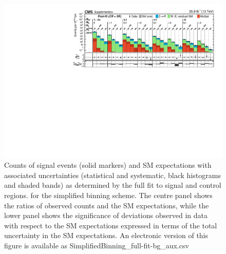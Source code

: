 \begin{figure}[h!]
  \centering
  \includegraphics[width=0.95\linewidth]{Supplementary/SimplifiedBinning_results_full-fit-bg_aux} 
  \caption{Counts of signal events (solid markers) and SM expectations
    with associated uncertainties (statistical and systematic, black
    histograms and shaded bands) 
    as determined by the full fit to signal and control regions.
    for the simplified binning scheme.
    The centre panel shows the ratios of
    observed counts and the SM expectations, while the lower panel
    shows the significance of deviations observed in data with respect
    to the SM expectations expressed in terms of the total uncertainty
    in the SM expectations.
    An electronic version of this figure is available as SimplifiedBinning\_full-fit-bg\_aux.csv
    }
  \label{fig:aggregated_results_full-fit}
\end{figure}

